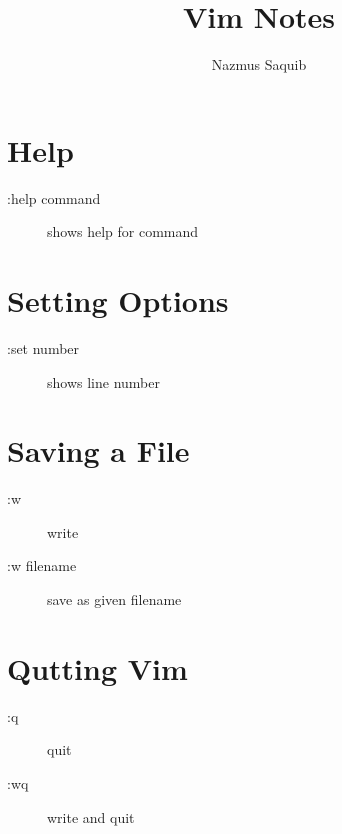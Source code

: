 \documentclass[a4paper, 12pt]{article}
\begin{document}
\title{Vim Notes}
\author{Nazmus Saquib}

\maketitle
\tableofcontents

\section{Help}
\begin{description}
	\item[:help command] shows help for command
\end{description}

\section{Setting Options}
\begin{description}
	\item[:set number] shows line number
\end{description}

\section{Saving a File}
\begin{description}
	\item[:w] write
	\item[:w filename] save as given filename
\end{description}

\section{Qutting Vim}
\begin{description}
	\item[:q] quit
	\item[:wq] write and quit
\end{description}

\end{document}
